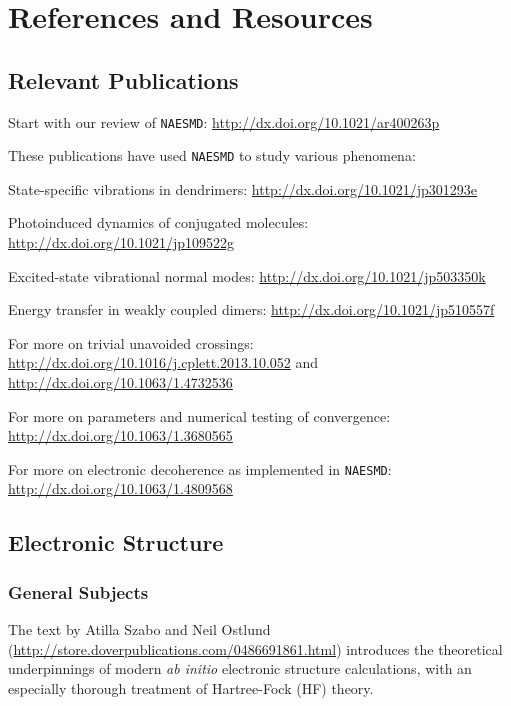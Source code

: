 \documentclass[12pt,letter,footinclude=true,headinclude=true,hyphens]{book} %
\begin{document}
    \chapter{References and Resources}

    \section{Relevant Publications}
    
    Start with our review of \texttt{NAESMD}: \url{http://dx.doi.org/10.1021/ar400263p}
    
    \noindent These publications have used \texttt{NAESMD} to study various phenomena:
    
    State-specific vibrations in dendrimers: \url{http://dx.doi.org/10.1021/jp301293e}
    
    
    Photoinduced dynamics of conjugated molecules: \url{http://dx.doi.org/10.1021/jp109522g}
    
    
    Excited-state vibrational normal modes: \url{http://dx.doi.org/10.1021/jp503350k}
    
    
    Energy transfer in weakly coupled dimers:  \url{http://dx.doi.org/10.1021/jp510557f}
    
    
    \noindent For more on trivial unavoided crossings: \url{http://dx.doi.org/10.1016/j.cplett.2013.10.052} and \url{http://dx.doi.org/10.1063/1.4732536}
    
    
    \noindent For more on parameters and numerical testing of convergence: \url{http://dx.doi.org/10.1063/1.3680565}
    
    
    \noindent For more on electronic decoherence as implemented in \texttt{NAESMD}: \url{http://dx.doi.org/10.1063/1.4809568}
    
    \section{Electronic Structure}
    
    \subsection{General Subjects}
    
    The text by Atilla Szabo and Neil Ostlund (\url{http://store.doverpublications.com/0486691861.html}) introduces the theoretical underpinnings of modern \emph{ab initio} electronic structure calculations, with an especially thorough treatment of Hartree-Fock (HF) theory. 
    
\end{document}
